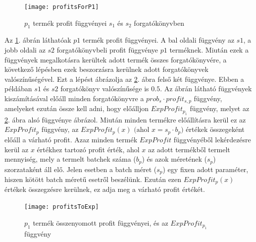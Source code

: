 \begin{figure}[H]
\begin{center}
\texttt{[image: profitsForP1]}
\caption{$p_1$ termék profit függvényei $s_1$ és $s_2$ forgatókönyvben}
\label{profit_for_p1}
\end{center}
\end{figure}
Az \ref{profit_for_p1}. ábrán láthatóak $p1$ termék profit függvényei.
A bal oldali függvény az $s1$, a jobb oldali az $s2$ forgatókönyvbeli profit függvénye $p1$ terméknek.
Miután ezek a függvények megalkotásra kerültek adott termék összes forgatókönyvére, a következő lépésben ezek beszorzásra kerülnek adott forgatókönyvek valószínűségével.
Ezt a lépést ábrázolja az \ref{profitsToExp}. ábra felső két függvénye.
Ebben a példában $s1$ és $s2$ forgatókönyv valószínűsége is $0.5$.
Az ábrán látható függvények kiszámításával előáll minden forgatókönyvre a $prob_s \cdot profit_{s,p}$ függvény, amelyeket ezután össze kell adni, hogy előálljon $ExpProfit_{p_1}$ függvény, melyet az \ref{profitsToExp}. ábra alsó függvénye ábrázol.
Miután minden termékre előállításra kerül ez az $ExpProfit_p$ függvény, az $ExpProfit_p(x) \text{ (ahol }x=s_p \cdot b_p)$ értékek összegeként előáll a várható profit.
Azaz minden termék $ExpProfit$ függvényéből lekérdezésre kerül az $x$ értékhez tartozó profit érték, ahol $x$ az adott termékből termelt mennyiség, mely a termelt batchek száma ($b_p$) és azok méretének ($s_p$) szorzataként áll elő.
Jelen esetben a batch méret ($s_p$) egy fixen adott paraméter, hiszen kötött batch méretű esetről beszélünk.
Ezután ezen $ExpProfit_p(x)$ értékek összegzésre kerülnek, ez adja meg a várható profit értékét.
\begin{figure}
\begin{center}
\texttt{[image: profitsToExp]}
\caption{$p_1$ termék összenyomott profit függvényei, és az $ExpProfit_{p_1}$ függvény}
\label{profitsToExp}
\end{center}
\end{figure}
